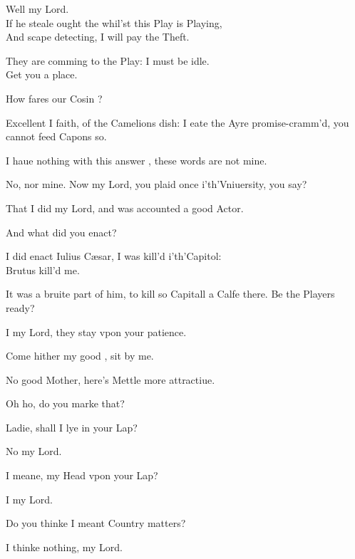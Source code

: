 \documentclass[a5paper,DIV=calc,11pt]{scrbook}
\begin{document}
\begin{drama*}
    \horspeaks Well my Lord.\\
    If he steale ought the whil'st this Play is Playing,\\
    And scape detecting, I will pay the Theft.
    
    
    \hamspeaks They are comming to the Play: I must be idle.\\
    Get you a place.
    
    \kingspeaks How fares our Cosin \ham?
    
    \hamspeaks Excellent I faith, of the Camelions dish: I eate the Ayre promise-cramm'd, you cannot feed Capons so.
    
    \kingspeaks I haue nothing with this answer \ham, these words are not mine.
    
    \hamspeaks No, nor mine. Now my Lord, you plaid once i'th'Vniuersity, you say?
    
    \polspeaks That I did my Lord, and was accounted a good Actor.
    
    \hamspeaks And what did you enact?
    
    \polspeaks I did enact Iulius Cæsar, I was kill'd i'th'Capitol:\\
    Brutus kill'd me.
    
    \hamspeaks It was a bruite part of him, to kill so Capitall a Calfe there. Be the Players ready?
    
    \rosinspeaks I my Lord, they stay vpon your patience.
    
    \queenspeaks Come hither my good \ham, sit by me.
    
    \hamspeaks No good Mother, here's Mettle more attractiue.
    
    \polspeaks Oh ho, do you marke that?
    
    \hamspeaks Ladie, shall I lye in your Lap?
    
    \ophespeaks No my Lord.
    
    \hamspeaks I meane, my Head vpon your Lap?
    
    \ophespeaks I my Lord.
    
    \hamspeaks Do you thinke I meant Country matters?
    
    \ophespeaks I thinke nothing, my Lord.
    

\end{drama*}
\end{document}
